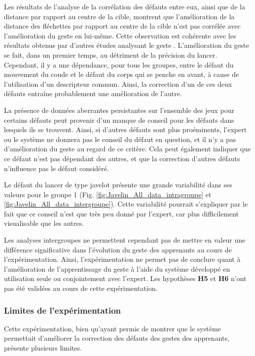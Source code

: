 Les résultats de l'analyse de la corrélation des défauts entre eux, ainsi que de la distance par rapport au centre de la cible, montrent que l'amélioration de la distance des fléchettes par rapport au centre de la cible n'est pas corrélée avec l'amélioration du geste en lui-même. Cette observation est cohérente avec les résultats obtenus par d'autres études analysant le geste \parencite{LeNaour2019S3V, Ashford2006OME}. L'amélioration du geste se fait, dans un premier temps, au détriment de la précision du lancer. Cependant, il y a une dépendance, pour tous les groupes, entre le défaut du mouvement du coude et le défaut du corps qui se penche en avant, à cause de l'utilisation d'un descripteur commun. Ainsi, la correction d'un de ces deux défauts entraîne probablement une amélioration de l'autre.

La présence de données aberrantes persistantes sur l'ensemble des jeux pour certains défauts peut provenir d'un manque de conseil pour les défauts dans lesquels ils se trouvent. Ainsi, si d'autres défauts sont plus proéminents, l'expert ou le système ne donnera pas le conseil du défaut en question, et il n'y a pas d'amélioration du geste au regard de ce critère. Cela peut également indiquer que ce défaut n'est pas dépendant des autres, et que la correction d'autres défauts n'influence pas le défaut considéré.

Le défaut du lancer de type javelot présente une grande variabilité dans ses valeurs pour le groupe 1 (Fig. \ref{fig:Javelin_All_data_intragroupe} et \ref{fig:Javelin_All_data_intergroupe}). Cette variabilité pourrait s'expliquer par le fait que ce conseil n'est que très peu donné par l'expert, car plus difficilement visualisable que les autres.

Les analyses intergroupes ne permettent cependant pas de mettre en valeur une différence significative dans l'évolution du geste des apprenants au cours de l'expérimentation. Ainsi, l'expérimentation ne permet pas de conclure quant à l'amélioration de l'apprentissage du geste à l'aide du système développé en utilisation seule ou conjointement avec l'expert. Les hypothèses \textbf{H5} et \textbf{H6} n'ont pas été validées au cours de cette expérimentation.

\subsubsection{Limites de l'expérimentation}
Cette expérimentation, bien qu'ayant permis de montrer que le système permettait d'améliorer la correction des défauts des gestes des apprenants, présente plusieurs limites.

